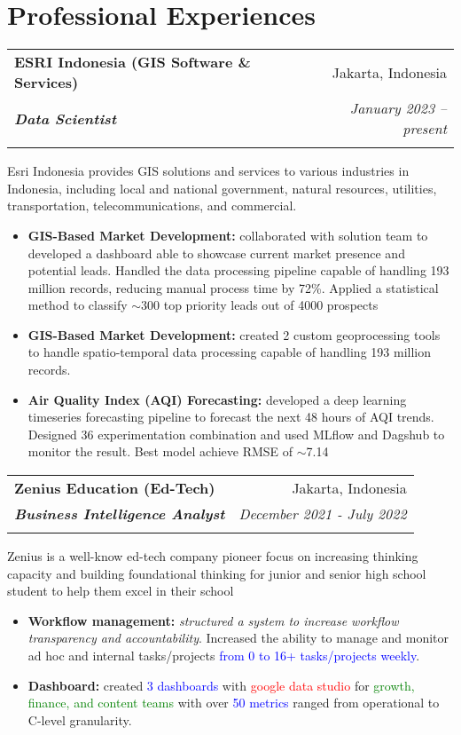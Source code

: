 \documentclass[a4paper, 11pt]{article}
\makeatletter
\newcommand{\resumeItem}[2]{
    \item\small{
        \textbf{#1}{#2 \vspace{-2pt}}
    }
}
\newcommand{\resumeSubheading}[4]{
    \vspace{-1pt}
    \begin{tabular*}{0.97\textwidth}{l@{\extracolsep{\fill}}r}
        \color{lightblue}\textbf{#1} & #2 \\
        \textbf{\textit{\small#3}} & \textit{\small #4} \\
        \textnormal{}\vspace{-5pt}
    \end{tabular*}\vspace{-5pt}
}
\newcommand{\resumeSubHeadingListStart}{\begin{itemize}[leftmargin=*]}
\newcommand{\resumeItemListStart}{\begin{itemize}[leftmargin=*]\setlength\itemsep{0em}\vspace{-1pt}}
\newcommand{\resumeItemListEnd}{\end{itemize}\vspace{-5pt}}
\makeatother
\begin{document}
    \section{Professional Experiences}
    \resumeSubheading
    {ESRI Indonesia (GIS Software \& Services)}{Jakarta, Indonesia}
    {Data Scientist}{January 2023 – present}
    {Esri Indonesia provides GIS solutions and services to various industries in 
    Indonesia, including local and national government, natural resources, utilities, 
    transportation, telecommunications, and commercial.}
    \vspace{-5pt}
    \resumeItemListStart
    \resumeItem{GIS-Based Market Development:}{ collaborated with solution team to 
    developed a dashboard able to showcase current market presence and potential leads. 
    Handled the data processing pipeline capable of handling 193 million records, 
    reducing manual process time by 72\%. Applied a statistical method to classify 
    $\sim$300 top priority leads out of 4000 prospects
    }
    \resumeItem{GIS-Based Market Development:}{ created 2 custom geoprocessing tools to 
    handle spatio-temporal data processing capable of handling 193 million records.
    }
    \resumeItem{Air Quality Index (AQI) Forecasting:}{ developed a deep learning 
    timeseries forecasting pipeline to forecast the next 48 hours of AQI trends. 
    Designed 36 experimentation combination and used MLflow and Dagshub to monitor the 
    result. Best model achieve RMSE of $\sim$7.14
    }
    \resumeItemListEnd
    
    \vspace{5pt}
    \resumeSubheading
    {Zenius Education (Ed-Tech)}
    {Jakarta, Indonesia}
    {Business Intelligence Analyst}
    {December 2021 - July 2022}
    {Zenius is a well-know ed-tech company pioneer focus on increasing thinking 
    capacity and building foundational thinking for junior and senior high school 
    student to help them excel in their school}
    \vspace{-5pt}
    \resumeItemListStart
    \resumeItem{Workflow management:}{ \textit{structured a system to increase 
    workflow transparency and accountability}. Increased the ability to manage 
    and monitor ad hoc and internal tasks/projects \textcolor{blue}{from 0 to 
    16+ tasks/projects weekly}.}
    \resumeItem{Dashboard:}{ created \textcolor{blue}{3 dashboards} with 
    \textcolor{red}{google data studio} for \textcolor{green}{growth, finance, 
    and content teams} with over \textcolor{blue}{50 metrics} ranged from 
    operational to C-level granularity.}
    \resumeItemListEnd
\end{document}
